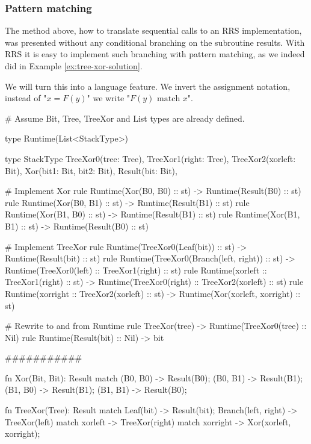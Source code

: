 \documentclass[11pt]{article}
\begin{document}
\subsubsection{Pattern matching}

The method above, how to translate sequential calls to an RRS implementation,
was presented without any conditional branching on the
subroutine results. With RRS it is easy to implement such branching with
pattern matching, as we indeed did in Example \ref{ex:tree-xor-solution}.

We will turn this into a language feature. We invert the assignment notation,
instead of "$x = F(y)$" we write "$F(y) \textrm{ match } x$".

\begin{rrscode}
# Assume Bit, Tree, TreeXor and List types are already defined.

type Runtime(List<StackType>)

type StackType {
  TreeXor0(tree: Tree),
  TreeXor1(right: Tree),
  TreeXor2(xorleft: Bit),
  Xor(bit1: Bit, bit2: Bit),
  Result(bit: Bit),
}

# Implement Xor
rule Runtime(Xor(B0, B0) :: st) -> Runtime(Result(B0) :: st)
rule Runtime(Xor(B0, B1) :: st) -> Runtime(Result(B1) :: st)
rule Runtime(Xor(B1, B0) :: st) -> Runtime(Result(B1) :: st)
rule Runtime(Xor(B1, B1) :: st) -> Runtime(Result(B0) :: st)

# Implement TreeXor
rule Runtime(TreeXor0(Leaf(bit)) :: st)
  -> Runtime(Result(bit) :: st)
rule Runtime(TreeXor0(Branch(left, right)) :: st)
  -> Runtime(TreeXor0(left) :: TreeXor1(right) :: st)
rule Runtime(xorleft :: TreeXor1(right) :: st)
  -> Runtime(TreeXor0(right) :: TreeXor2(xorleft) :: st)
rule Runtime(xorright :: TreeXor2(xorleft) :: st)
  -> Runtime(Xor(xorleft, xorright) :: st)

# Rewrite to and from Runtime
rule TreeXor(tree) -> Runtime(TreeXor0(tree) :: Nil)
rule Runtime(Result(bit) :: Nil) -> bit

###########

fn Xor(Bit, Bit): Result match {
  (B0, B0) -> Result(B0);
  (B0, B1) -> Result(B1);
  (B1, B0) -> Result(B1);
  (B1, B1) -> Result(B0);
}

fn TreeXor(Tree): Result match {
  Leaf(bit) -> Result(bit);
  Branch(left, right)
    -> TreeXor(left) match xorleft
    -> TreeXor(right) match xorright
    -> Xor(xorleft, xorright);
}

\end{rrscode}
\end{document}
